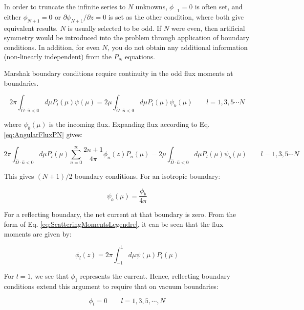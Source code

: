 \documentclass[10pt]{article}
\newcommand{\hO}{\hat{\Omega}}
\newcounter{subsubsubsection}[subsubsection]
\begin{document}
\begin{flushleft}
In order to truncate the infinite series to \(N\) unknowns, \(\phi_{-1}=0\) is often set, and either \(\phi_{N+1}=0\) or \(\partial\phi_{N+1}/\partial z=0\) is set as the other condition, where both give equivalent results. \(N\) is usually selected to be odd. If \(N\) were even, then artificial symmetry would be introduced into the problem through application of boundary conditions. In addition, for even \(N\), you do not obtain any additional information (non-linearly independent) from the \(P_N\) equations. 

Marshak boundary conditions require continuity in the odd flux moments at boundaries. 

\begin{equation}
2\pi\int_{\hO  \cdot\hat{n}<0}^{}d\mu P_l(\mu)\psi(\mu)=2\mu\int_{\hO  \cdot\hat{n}<0}^{}d\mu P_l(\mu)\psi_b(\mu)\quad\quad l=1, 3, 5\cdots N
\end{equation}

where \(\psi_b(\mu)\) is the incoming flux. Expanding flux according to Eq. \eqref{eq:AngularFluxPN} gives:

\begin{equation}
2\pi\int_{\hO  \cdot\hat{n}<0}^{}d\mu P_l(\mu)\sum_{n=0}^{\infty}\frac{2n+1}{4\pi}\phi_n(z)P_n(\mu)=2\mu\int_{\hO  \cdot\hat{n}<0}^{}d\mu P_l(\mu)\psi_b(\mu)\quad\quad l=1, 3, 5\cdots N
\end{equation}

This gives \((N+1)/2\) boundary conditions. For an isotropic boundary:

\begin{equation}
\psi_b(\mu)=\frac{\phi_b}{4\pi}
\end{equation}

For a reflecting boundary, the net current at that boundary is zero. From the form of Eq. \eqref{eq:ScatteringMomentsLegendre}, it can be seen that the flux moments are given by:

\begin{equation}
\phi_l(z)=2\pi\int_{-1}^{1}d\mu\psi(\mu)P_l(\mu)
\end{equation}

For \(l=1\), we see that \(\phi_1\) represents the current. Hence, reflecting boundary conditions extend this argument to require that on vacuum boundaries:

\begin{equation}
\phi_l=0\quad\quad l=1, 3, 5, \cdots, N
\end{equation}


\end{flushleft}
\end{document}
